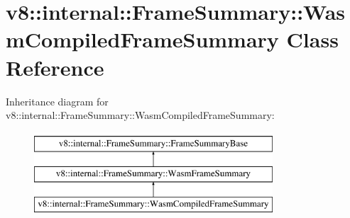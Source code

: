 \hypertarget{classv8_1_1internal_1_1FrameSummary_1_1WasmCompiledFrameSummary}{}\section{v8\+:\+:internal\+:\+:Frame\+Summary\+:\+:Wasm\+Compiled\+Frame\+Summary Class Reference}
\label{classv8_1_1internal_1_1FrameSummary_1_1WasmCompiledFrameSummary}
Inheritance diagram for v8\+:\+:internal\+:\+:Frame\+Summary\+:\+:Wasm\+Compiled\+Frame\+Summary\+:\begin{figure}[H]
\begin{center}
\leavevmode
\includegraphics[height=3.000000cm]{classv8_1_1internal_1_1FrameSummary_1_1WasmCompiledFrameSummary}
\end{center}
\end{figure}
